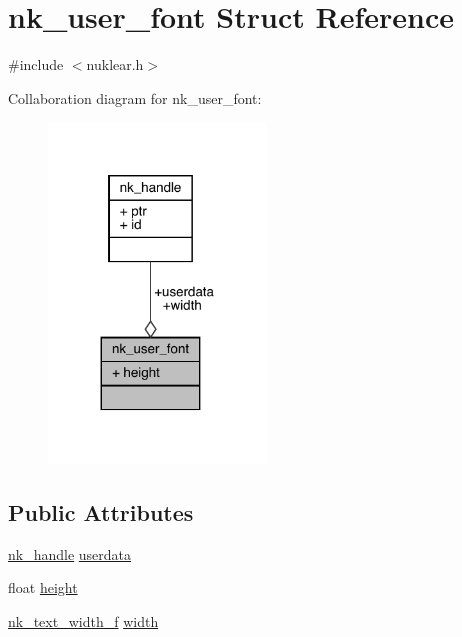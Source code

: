 \hypertarget{structnk__user__font}{}\section{nk\+\_\+user\+\_\+font Struct Reference}
\label{structnk__user__font}


{\ttfamily \#include $<$nuklear.\+h$>$}



Collaboration diagram for nk\+\_\+user\+\_\+font\+:
\nopagebreak
\begin{figure}[H]
\begin{center}
\leavevmode
\includegraphics[width=164pt]{structnk__user__font__coll__graph}
\end{center}
\end{figure}
\subsection*{Public Attributes}
\begin{DoxyCompactItemize}
\item 
\mbox{\hyperlink{unionnk__handle}{nk\+\_\+handle}} \mbox{\hyperlink{structnk__user__font_a227c31a1ef360c78c98678d8d8546c03}{userdata}}
\item 
float \mbox{\hyperlink{structnk__user__font_ab98ed37df408e0c2febfe448897ccf82}{height}}
\item 
\mbox{\hyperlink{nuklear_8h_a980ba414f6e3d6490236a688e7b51b1a}{nk\+\_\+text\+\_\+width\+\_\+f}} \mbox{\hyperlink{structnk__user__font_aac686ca3e72208ddfb982caa7c89293a}{width}}
\end{DoxyCompactItemize}


